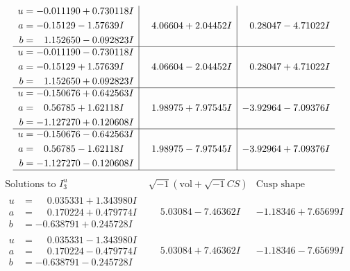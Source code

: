 \documentclass[1p]{elsarticle_modified}
\theoremstyle{definition}
\newcommand{\I}{\sqrt{-1}}
\begin{document}
$$\begin{array}{c|c|c}
\begin{aligned}
u &= -0.011190 + 0.730118 I \\
a &= -0.15129 - 1.57639 I \\
b &= \phantom{-}1.152650 - 0.092823 I\end{aligned}
 & \phantom{-}4.06604 + 2.04452 I & \phantom{-}0.28047 - 4.71022 I \\ \hline\begin{aligned}
u &= -0.011190 - 0.730118 I \\
a &= -0.15129 + 1.57639 I \\
b &= \phantom{-}1.152650 + 0.092823 I\end{aligned}
 & \phantom{-}4.06604 - 2.04452 I & \phantom{-}0.28047 + 4.71022 I \\ \hline\begin{aligned}
u &= -0.150676 + 0.642563 I \\
a &= \phantom{-}0.56785 + 1.62118 I \\
b &= -1.127270 + 0.120608 I\end{aligned}
 & \phantom{-}1.98975 + 7.97545 I & -3.92964 - 7.09376 I \\ \hline\begin{aligned}
u &= -0.150676 - 0.642563 I \\
a &= \phantom{-}0.56785 - 1.62118 I \\
b &= -1.127270 - 0.120608 I\end{aligned}
 & \phantom{-}1.98975 - 7.97545 I & -3.92964 + 7.09376 I\\
 \hline 
 \end{array}$$\newpage$$\begin{array}{c|c|c}  
\text{Solutions to }I^u_{3}& \I (\text{vol} + \sqrt{-1}CS) & \text{Cusp shape}\\
 \hline 
\begin{aligned}
u &= \phantom{-}0.035331 + 1.343980 I \\
a &= \phantom{-}0.170224 + 0.479774 I \\
b &= -0.638791 + 0.245728 I\end{aligned}
 & \phantom{-}5.03084 - 7.46362 I & -1.18346 + 7.65699 I \\ \hline\begin{aligned}
u &= \phantom{-}0.035331 - 1.343980 I \\
a &= \phantom{-}0.170224 - 0.479774 I \\
b &= -0.638791 - 0.245728 I\end{aligned}
 & \phantom{-}5.03084 + 7.46362 I & -1.18346 - 7.65699 I \\ \hline\begin{aligned}

\end{aligned}
\end{array}$$
\end{document}
